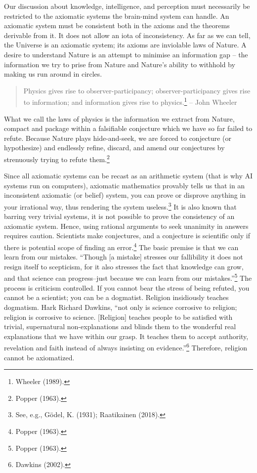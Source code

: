 \begin{multicols}{2}
Our discussion about knowledge, intelligence, and perception must necessarily be restricted to the axiomatic systems the brain-mind system can handle. An axiomatic system must be consistent both in the axioms and the theorems derivable from it. It does not allow an iota of inconsistency. As far as we can tell, the Universe is an axiomatic system; its axioms are inviolable laws of Nature. A desire to understand Nature is an attempt to minimise an information gap – the information we try to prise from Nature and Nature's ability to withhold by making us run around in circles.

\begin{quote}
Physics gives rise to observer-participancy; observer-participancy gives rise to information; and information gives rise to physics.\footnote{Wheeler (1989).}  – John Wheeler
\end{quote}

What we call the laws of physics is the information we extract from Nature, compact and package within a falsifiable conjecture which we have so far failed to refute. Because Nature plays hide-and-seek, we are forced to conjecture (or hypothesize) and endlessly refine, discard, and amend our conjectures by strenuously trying to refute them.\footnote{Popper (1963).} 

Since all axiomatic systems can be recast as an arithmetic system (that is why AI systems run on computers), axiomatic mathematics provably tells us that in an inconsistent axiomatic (or belief) system, you can prove or disprove anything in your irrational way, thus rendering the system useless.\footnote{See, e.g., Gödel, K. (1931); Raatikainen (2018).}  It is also known that barring very trivial systems, it is not possible to prove the consistency of an axiomatic system. Hence, using rational arguments to seek unanimity in answers requires caution. Scientists make conjectures, and a conjecture is scientific only if there is potential scope of finding an error.\footnote{Popper (1963).}  The basic premise is that we can learn from our mistakes. “Though [a mistake] stresses our fallibility it does not resign itself to scepticism, for it also stresses the fact that knowledge can grow, and that science can progress--just because we can learn from our mistakes.”\footnote{Popper (1963).}  The process is criticism controlled. If you cannot bear the stress of being refuted, you cannot be a scientist; you can be a dogmatist. Religion insidiously teaches dogmatism. Hark Richard Dawkins, “not only is science corrosive to religion; religion is corrosive to science. [Religion] teaches people to be satisfied with trivial, supernatural non-explanations and blinds them to the wonderful real explanations that we have within our grasp. It teaches them to accept authority, revelation and faith instead of always insisting on evidence.”\footnote{Dawkins (2002).}  Therefore, religion cannot be axiomatized.


\end{multicols}
